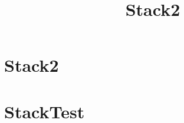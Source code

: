 \documentclass{article}
\begin{document}
\title{Stack2}
\author{}
\maketitle
\tableofcontents

\section{Stack2}

\section{StackTest}

\end{document}
